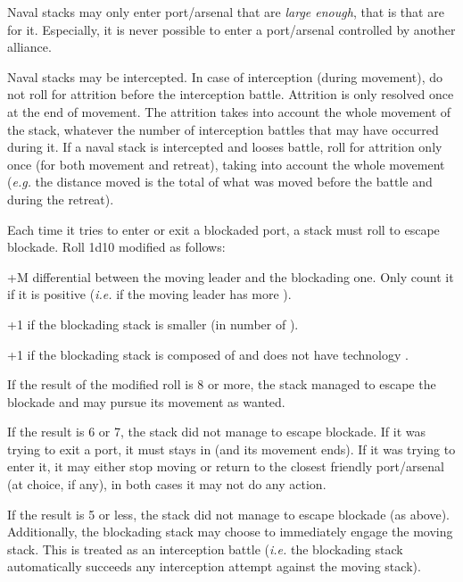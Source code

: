 Naval stacks may only enter port/arsenal that are \emph{large enough}, that is
that are \SoS for it. Especially, it is never possible to enter a port/arsenal
controlled by another alliance.

Naval stacks may be intercepted. In case of interception (during movement), do
not roll for attrition before the interception battle. Attrition is only
resolved once at the end of movement. The attrition takes into account the
whole movement of the stack, whatever the number of interception battles that
may have occurred during it. If a naval stack is intercepted and looses
battle, roll for attrition only once (for both movement and retreat), taking
into account the whole movement (\emph{e.g.} the distance moved is the total
of what was moved before the battle and during the retreat).

Each time it tries to enter or exit a blockaded port, a stack must roll to
escape blockade. Roll 1d10 modified as follows:
\begin{modlist}
\item[+M] \Man differential between the moving leader and the blockading
  one. Only count it if it is positive (\emph{i.e.} if the moving leader has
  more \Man).
\item[+1] if the blockading stack is smaller (in number of \ND).
\item[+1] if the blockading stack is composed of \NWD and does not have
  technology \TSF.
\end{modlist}

If the result of the modified roll is 8 or more, the stack managed to escape
the blockade and may pursue its movement as wanted.

If the result is 6 or 7, the stack did not manage to escape blockade. If it
was trying to exit a port, it must stays in (and its movement ends). If it was
trying to enter it, it may either stop moving or return to the closest
friendly port/arsenal (at choice, if any), in both cases it may not do any
action.

If the result is 5 or less, the stack did not manage to escape blockade (as
above). Additionally, the blockading stack may choose to immediately engage
the moving stack. This is treated as an interception battle (\emph{i.e.} the
blockading stack automatically succeeds any interception attempt against the
moving stack).


